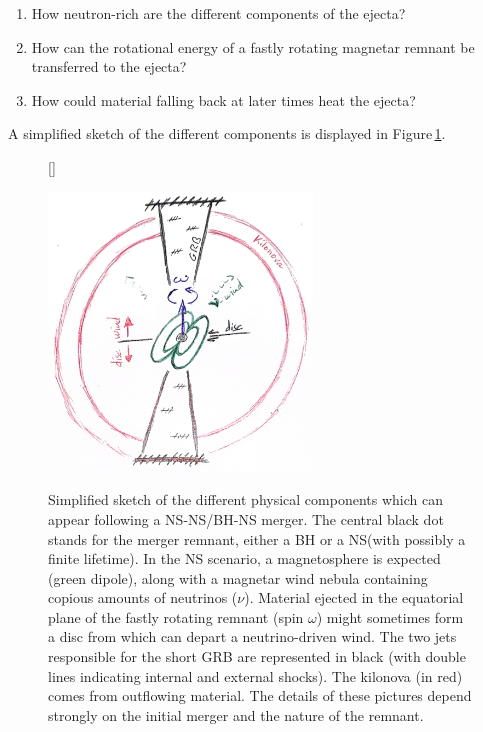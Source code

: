 \documentclass[12pt,onecolumn]{article}
\makeatletter
\newcommand{\grb}{GRB\xspace}
\newcommand*{\ns}{NS\@\xspace}
\newcommand*{\bh}{BH\@\xspace}
\makeatother
\begin{document}
\begin{enumerate}
\item How neutron-rich are the different components of the ejecta?
\item How can the rotational energy of a fastly rotating magnetar remnant be transferred to the ejecta?
\item How could material falling back at later times heat the ejecta?
\end{enumerate}

A simplified sketch of the different components is displayed in Figure\,\ref{fig:sketch}.

\begin{figure}[!h]
\vspace*{0.3cm}
[\FBwidth]
{\caption{Simplified sketch of the different physical components which can appear following a \ns-\ns/\bh-\ns merger. The central black dot stands for the merger remnant, either a \bh or a \ns (with possibly a finite lifetime). In the \ns scenario, a magnetosphere is expected (green dipole), along with a magnetar wind nebula containing copious amounts of neutrinos ($\nu$). Material ejected in the equatorial plane of the fastly rotating remnant (spin $\omega$) might sometimes form a disc from which can depart a neutrino-driven wind. The two jets responsible for the short \grb are represented in black (with double lines indicating internal and external shocks). The kilonova (in red) comes from outflowing material. The details of these pictures depend strongly on the initial merger and the nature of the remnant.}\label{fig:sketch}}
{\includegraphics[width=7cm]{Figures/sketch_GRB_kilonova.jpg}}
\vspace*{-0.4cm}
\end{figure}
\end{document}
